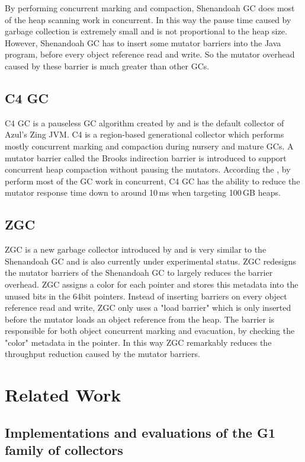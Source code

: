 By performing concurrent marking and compaction, Shenandoah GC does most of the
heap scanning work in concurrent. In this way the pause time caused by garbage collection
is extremely small and is not proportional to the heap size.
However, Shenandoah GC has to insert some mutator barriers into the Java program,
before every object reference read and write. So the mutator overhead caused by
these barrier is much greater than other GCs.

\subsection{C4 GC}

C4 GC is a pauseless GC algorithm created by \cite{tene2011c4} and is the default
collector of Azul's Zing JVM. C4 is a region-based generational collector which
performs mostly concurrent marking and compaction during nursery and mature GCs.
A mutator barrier called the Brooks indirection barrier is introduced to support
concurrent heap compaction without pausing the mutators. According the \cite{tene2011c4},
by perform most of the GC work in concurrent, C4 GC has the ability to reduce the
mutator response time down to around 10\,ms when targeting 100\,GB heaps.

\subsection{ZGC}

ZGC is a new garbage collector introduced by \cite{liden_karlsson_2018} and
is very similar to the Shenandoah GC and is also currently under experimental status.
ZGC redesigns the mutator barriers of the Shenandoah GC to largely reduces the barrier
overhead.
ZGC assigns a color for each pointer and stores this metadata into the
unused bits in the 64bit pointers.
Instead of inserting barriers on every object reference read and write,
ZGC only uses a "load barrier" which is only inserted before the mutator loads an
object reference from the heap. The barrier is responsible for both object concurrent marking
and evacuation, by checking the "color" metadata in the pointer.
In this way ZGC remarkably reduces the throughput reduction caused by the mutator
barriers.

\section{Related Work}
\label{sec:relatedwork}

\subsection{Implementations and evaluations of the G1 family of collectors}

